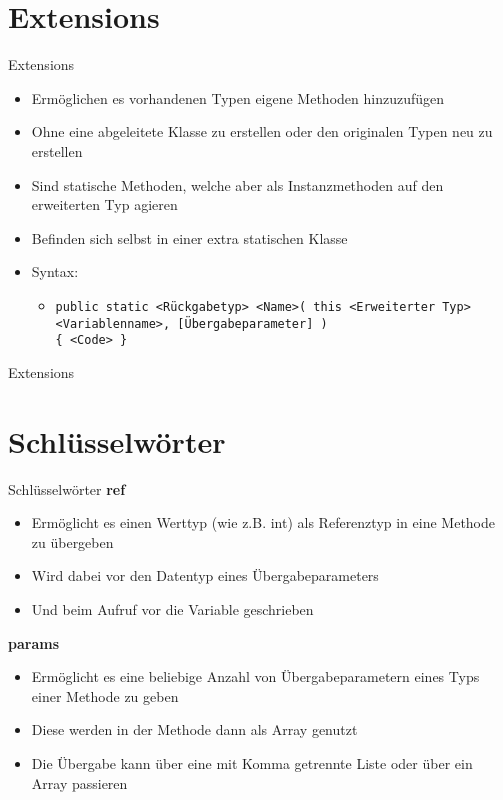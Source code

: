 \section{Extensions}
\begin{frame}{Extensions}
	\begin{itemize}
		\item Ermöglichen es vorhandenen Typen eigene Methoden hinzuzufügen
		\item Ohne eine abgeleitete Klasse zu erstellen oder den originalen Typen neu zu erstellen
		\item Sind statische Methoden, welche aber als Instanzmethoden auf den erweiterten Typ agieren
		\item Befinden sich selbst in einer extra statischen Klasse
		\item Syntax:
		\begin{itemize}
			\item \texttt{public static \alert{<Rückgabetyp> <Name>}( this \alert{<Erweiterter Typ> <Variablenname>}, \alert{[Übergabeparameter]} )\\ \{ \alert{<Code>} \}}
		\end{itemize}
	\end{itemize}
\end{frame}

\begin{frame}{Extensions}
	
\end{frame}

\section{Schlüsselwörter}
\begin{frame}{Schlüsselwörter}
	\textbf{ref}\\
	\begin{itemize}
		\item Ermöglicht es einen Werttyp (wie z.B. int) als Referenztyp in eine Methode zu übergeben
		\item Wird dabei vor den Datentyp eines Übergabeparameters
		\item Und beim Aufruf vor die Variable geschrieben
	\end{itemize}
	\textbf{params}\\
	\begin{itemize}
		\item Ermöglicht es eine beliebige Anzahl von Übergabeparametern eines Typs einer Methode zu geben
		\item Diese werden in der Methode dann als Array genutzt
		\item Die Übergabe kann über eine mit Komma getrennte Liste oder über ein Array passieren
	\end{itemize}
\end{frame}

